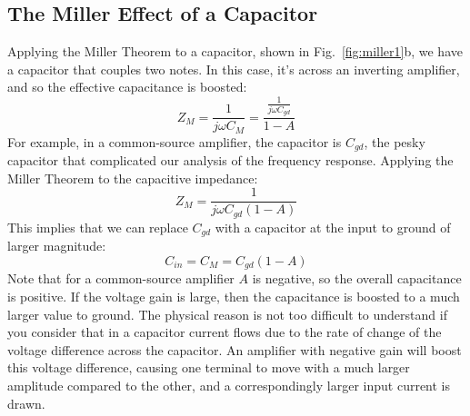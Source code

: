 \subsection{The Miller Effect of a Capacitor}
Applying the Miller Theorem to a capacitor, shown in Fig.~\ref{fig:miller1}b, we have a capacitor that couples two notes.  In this case, it's across an inverting amplifier, and so the effective capacitance is boosted:
    \begin{equation}
        Z_M = \frac{1}{j\omega C_M} = \frac{\frac{1}{j\omega C_{gd}}}{ 1 - A}
    \end{equation}
For example, in a common-source amplifier, the capacitor is $C_{gd}$, the pesky capacitor that complicated our analysis of the frequency response.  Applying the Miller Theorem to the capacitive impedance: 
    \begin{equation}
        Z_M = \frac{1}{j\omega C_{gd} (1 - A)}
    \end{equation}
This implies that we can replace $C_{gd}$ with a capacitor at the input to ground of larger magnitude:
    \begin{equation}
        C_{in} = C_M  = C_{gd} (1-A)
    \end{equation}
Note that for a common-source amplifier $A$ is negative, so the overall capacitance is positive.  If the voltage gain is large, then the capacitance is boosted to a much larger value to ground.  The physical reason is not too difficult to understand if you consider that in a capacitor current flows due to the rate of change of the voltage difference  across the capacitor.  An amplifier with negative gain will boost this voltage difference, causing one terminal to move with a much larger amplitude compared to the other, and a correspondingly larger input current is drawn. 
